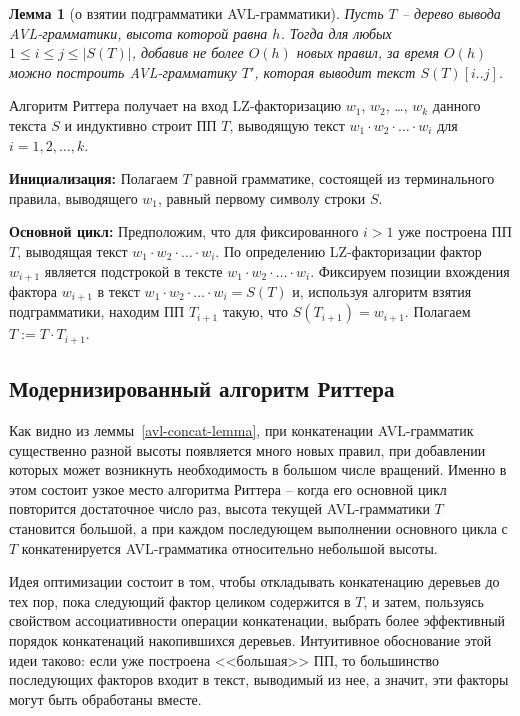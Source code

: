 \documentclass[14pt]{article}
\newtheorem{lemma}{Лемма}[section]
\newcommand{\concat}[4]{
    #1_{#2} \cdot #1_{#3} \cdot \ldots \cdot #1_{#4}
}
\begin{document}
\begin{lemma}[о взятии подграмматики AVL-грам\-ма\-тики]
Пусть $T$ -- дерево вывода AVL-грамматики, высота которой равна $h$. Тогда для любых $1 \leq i \leq j \leq |S(T)|$,
добавив не более $O(h)$ новых правил, за время $O(h)$ можно построить AVL-грамматику $T'$, которая выводит текст $S(T)[i..j]$.
\end{lemma}

\medskip

{\sc Алгоритм Риттера} получает на вход LZ-факторизацию $w_1$, $w_2$, \dots, $w_k$ данного текста $S$ и индуктивно строит ПП $T$,
выводящую текст $\concat{w}{1}{2}{i}$ для $i=1,2,\ldots,k$.

\smallskip

\noindent\textbf{Инициализация:} Полагаем $T$ равной грамматике, состоящей из терминального правила, выводящего $w_1$, равный первому символу строки $S$.

\smallskip

\noindent\textbf{Основной цикл:} Предположим, что для фиксированного $i > 1$ уже построена ПП $T$, выводящая текст
$\concat{w}{1}{2}{i}$. По определению  LZ-факторизации фактор $w_{i+1}$ является подстрокой в тексте $\concat{w}{1}{2}{i}$. Фиксируем
позиции вхождения фактора $w_{i+1}$ в текст $\concat{w}{1}{2}{i} = S(T)$ и, используя алгоритм взятия подграмматики, находим ПП $T_{i+1}$
такую, что $S(T_{i+1}) = w_{i+1}$. Полагаем $T:=T \cdot T_{i+1}$.

\subsection{Модернизированный алгоритм Риттера}
\label{HeuricticsRytter}

Как видно из леммы~\ref{avl-concat-lemma}, при конкатенации  AVL-грам\-ма\-тик существенно разной высоты появляется много новых правил, при
добавлении которых может возникнуть необходимость в большом числе вращений. Именно в этом состоит узкое место алгоритма Риттера -- когда
его основной цикл повторится достаточное число раз, высота текущей AVL-грамматики $T$ становится большой, а при каждом последующем
выполнении основного цикла с $T$ конкатенируется AVL-грамматика относительно небольшой высоты.

Идея оптимизации \cite{OurPracticalTest} состоит в том, чтобы откладывать конкатенацию деревьев до тех пор, пока следующий фактор целиком содержится в $T$, и 
затем, пользуясь свойством ассоциативности операции конкатенации, выбрать более эффективный порядок конкатенаций накопившихся деревьев. 
Интуитивное обоснование этой идеи таково: если уже построена <<большая>> ПП, то большинство последующих
факторов входит в текст, выводимый из нее, а значит, эти факторы могут быть обработаны вместе.
\end{document}

